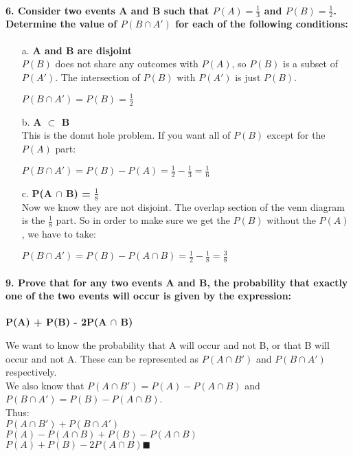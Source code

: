 \documentclass{article}
\begin{document}
\paragraph{6. Consider two events A and B such that $P(A)=\frac{1}{3}$
and $P(B)=\frac{1}{2}$. Determine the value of $P(B \cap A')$ for each of
the following conditions:}
\begin{enumerate}
\item[a.] \textbf{A and B are disjoint}\\
$P(B)$ does not share any outcomes with $P(A)$, so $P(B)$ is a subset
of $P(A')$. The intersection of $P(B)$ with $P(A')$ is just $P(B)$.
\begin{center}
$\boxed{P(B \cap A') = P(B) = \frac{1}{2}}$
\end{center}

\item[b.] \textbf{A $\subset$ B}\\
This is the donut hole problem. If you want all of $P(B)$ except for the $P(A)$
part:
\begin{center}
$\boxed{P(B \cap A') = P(B)-P(A)=\frac{1}{2}-\frac{1}{3}=\frac{1}{6}}$
\end{center}

\item[c.] \textbf{P(A $\cap$ B) = $\frac{1}{8}$}\\
Now we know they are not disjoint. The overlap section of the venn diagram
is the $\frac{1}{8}$ part. So in order to make sure we get the $P(B)$ without
the $P(A)$, we have to take:
\begin{center}
$\boxed{P(B \cap A') = P(B) - P(A \cap B) = \frac{1}{2}-\frac{1}{8}=\frac{3}{8}}$
\end{center}
\end{enumerate}

\paragraph{9. Prove that for any two events A and B, the probability that exactly
one of the two events will occur is given by the expression:}
\begin{center}
\textbf{P(A) + P(B) - 2P(A $\cap$ B)}
\end{center}
We want to know the probability that A will occur and not B,
or that B will occur and not A. These can be represented as $P(A \cap B')$ and
$P(B \cap A')$ respectively.\\
We also know that $P(A \cap B') = P(A)-P(A \cap B)$ and
$P(B \cap A') = P(B)-P(A \cap B)$.\\
Thus:\\
$P(A \cap B') + P(B \cap A')$\\
$P(A)-P(A \cap B) + P(B) - P(A \cap B)$\\
$P(A) + P(B) - 2P(A \cap B) \blacksquare$
\end{document}
